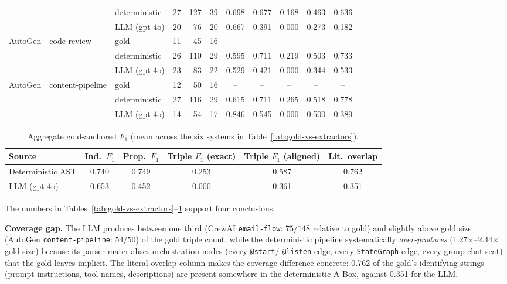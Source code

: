 \begin{table}[ht]
{\begin{tabular}{l l l r r r c c c c c}
              &                         & deterministic & 27 & 127 & 39 & 0.698 & 0.677 & 0.168 & 0.463 & 0.636 \\
              &                         & LLM (gpt-4o)  & 20 & \phantom{0}76 & 20 & 0.667 & 0.391 & 0.000 & 0.273 & 0.182 \\
    \addlinespace
    AutoGen   & code-review             & gold          & 11 & \phantom{0}45 & 16 & --    & --    & --    & --    & --    \\
              &                         & deterministic & 26 & 110 & 29 & 0.595 & 0.711 & 0.219 & 0.503 & 0.733 \\
              &                         & LLM (gpt-4o)  & 23 & \phantom{0}83 & 22 & 0.529 & 0.421 & 0.000 & 0.344 & 0.533 \\
    \addlinespace
    AutoGen   & content-pipeline        & gold          & 12 & \phantom{0}50 & 16 & --    & --    & --    & --    & --    \\
              &                         & deterministic & 27 & 116 & 29 & 0.615 & 0.711 & 0.265 & 0.518 & 0.778 \\
              &                         & LLM (gpt-4o)  & 14 & \phantom{0}54 & 17 & 0.846 & 0.545 & 0.000 & 0.500 & 0.389 \\
    \bottomrule
  \end{tabular}
  }
\end{table}

\begin{table}[ht]
  \centering
  \small
  \caption{Aggregate gold-anchored $F_1$ (mean across the six
    systems in Table~\ref{tab:gold-vs-extractors}).}
  \label{tab:gold-aggregate}
  \begin{tabular}{l c c c c c}
    \toprule
    Source & Ind.\ $F_1$ & Prop.\ $F_1$ & Triple $F_1$ (exact)
           & Triple $F_1$ (aligned) & Lit.\ overlap\\
    \midrule
    Deterministic AST     & 0.740 & 0.749 & 0.253 & 0.587 & 0.762\\
    LLM (gpt-4o)          & 0.653 & 0.452 & 0.000 & 0.361 & 0.351\\
    \bottomrule
  \end{tabular}
\end{table}

The numbers in
Tables~\ref{tab:gold-vs-extractors}--\ref{tab:gold-aggregate} support
four conclusions.

\textbf{Coverage gap.} The LLM produces between one third (CrewAI
\texttt{email-flow}: $75/148$ relative to gold) and slightly above
gold size (AutoGen \texttt{content-pipeline}: $54/50$) of the gold
triple count, while the deterministic pipeline systematically
\emph{over-produces} (1.27$\times$--2.44$\times$ gold size) because
its parser materialises orchestration nodes (every \texttt{@start}/
\texttt{@listen} edge, every \texttt{StateGraph} edge, every
group-chat seat) that the gold leaves implicit. The literal-overlap
column makes the coverage difference concrete: 0.762 of the gold's
identifying strings (prompt instructions, tool names, descriptions)
are present somewhere in the deterministic A-Box, against 0.351 for
the LLM.

